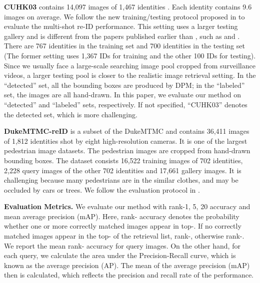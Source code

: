 \textbf{CUHK03} contains 14,097 images of 1,467 identities \cite{li2014deepreid}. Each identity contains 9.6 images on average. We follow the new training/testing protocol proposed in \cite{zhong2017re} to evaluate the multi-shot re-ID performance. This setting uses a larger testing gallery and is different from the papers published earlier than \cite{zhong2017re}, such as \cite{liu2016end} and \cite{varior2016siamese}. There are 767 identities in the training set and 700 identities in the testing set (The former setting uses 1,367 IDs for training and the other 100 IDs for testing). Since we usually face a large-scale searching image pool cropped from surveillance videos, a larger testing pool is closer to the realistic image retrieval setting. In the ``detected'' set, all the bounding boxes are produced by DPM; in the ``labeled'' set, the images are all hand-drawn. In this paper, we evaluate our method on ``detected'' and ``labeled'' sets, respectively. If not specified, ``CUHK03'' denotes the detected set, which is more challenging.

\textbf{DukeMTMC-reID} is a subset of the DukeMTMC \cite{ristani2016MTMC} and contains 36,411 images of 1,812 identities shot by eight high-resolution cameras. It is one of the largest pedestrian image datasets. The pedestrian images are cropped from hand-drawn bounding boxes. The dataset consists 16,522 training images of 702 identities, 2,228 query images of the other 702 identities and 17,661 gallery images. It is challenging because many pedestrians are in the similar clothes, and may be occluded by cars or trees. We follow the evaluation protocol in \cite{zheng2017unlabeled}.

\textbf{Evaluation Metrics.} We evaluate our method with rank-1, 5, 20 accuracy and mean average precision (mAP). Here, rank- accuracy denotes the probability whether one or more correctly matched images appear in top-. If no correctly matched images appear in the top- of the retrieval list, rank-, otherwise rank-. We report the mean rank- accuracy for query images. On the other hand, for each query, we calculate the area under the Precision-Recall curve, which is known as the average precision (AP). The mean of the average precision (mAP) then is calculated, which reflects the precision and recall rate of the performance.

